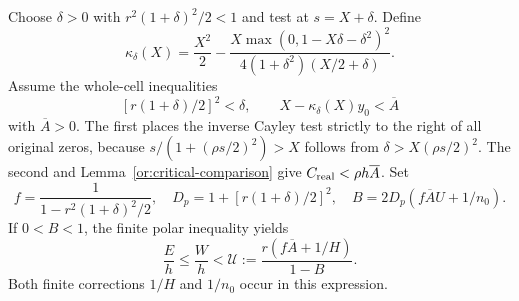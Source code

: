 \documentclass[11pt,reqno]{amsart}
\numberwithin{equation}{section}
\theoremstyle{definition}
\theoremstyle{remark}
\begin{document}
Choose $\delta>0$ with $r^2(1+\delta)^2/2<1$ and test at
$s=X+\delta$. Define
\begin{equation}\label{sm:extension-kappa}
 \kappa_\delta(X)=\frac{X^2}{2}
 -\frac{X\max(0,1-X\delta-\delta^2)^2}
           {4(1+\delta^2)(X/2+\delta)}.
\end{equation}
Assume the whole-cell inequalities
\begin{equation}\label{sm:extension-A}
 [r(1+\delta)/2]^2<\delta,\qquad
 X-\kappa_\delta(X)y_0<\overline A
\end{equation}
with $\overline A>0$. The first places the inverse Cayley test
strictly to the right of all original zeros, because
$s/(1+(\rho s/2)^2)>X$ follows from
$\delta>X(\rho s/2)^2$. The second and
Lemma~\ref{or:critical-comparison} give
$C_{\rm real}<\rho h\overline A$.
Set
\[
 f=\frac1{1-r^2(1+\delta)^2/2},\quad
 D_p=1+[r(1+\delta)/2]^2,\quad
 B=2D_p(f\overline A U+1/n_0).
\]
If $0<B<1$, the finite polar inequality yields
\begin{equation}\label{sm:extension-HB-upper}
 \frac Eh\le\frac Wh<
       \mathcal U:=\frac{r(f\overline A+1/H)}{1-B}.
\end{equation}
Both finite corrections $1/H$ and $1/n_0$ occur in this expression.
\end{document}

